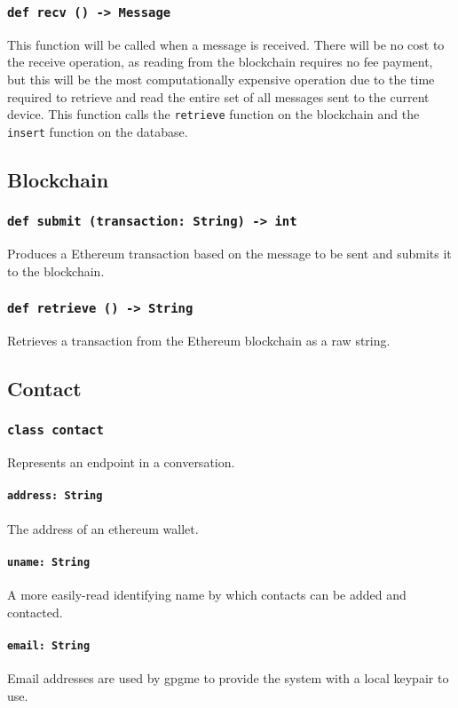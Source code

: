 \documentclass[]{article}
\begin{document}
\subsubsection{\texttt{def recv () -> Message}}
This function will be called when a message is received. There will be no cost to the receive operation, as reading from the blockchain requires no fee payment, but this will be the most computationally expensive operation due to the time required to retrieve and read the entire set of all messages sent to the current device. This function calls the \texttt{retrieve} function on the blockchain and the \texttt{insert} function on the database.

\subsection{Blockchain}
\subsubsection{\texttt{def submit (transaction: String) -> int}}
Produces a Ethereum transaction based on the message to be sent and submits it to the blockchain.
\subsubsection{\texttt{def retrieve () -> String}}
Retrieves a transaction from the Ethereum blockchain as a raw string.

\subsection{Contact}
\subsubsection{\texttt{class contact}}
Represents an endpoint in a conversation.
\paragraph{\texttt{address: String}}
The address of an ethereum wallet.
\paragraph{\texttt{uname: String}}
A more easily-read identifying name by which contacts can be added and contacted.
\paragraph{\texttt{email: String}}
Email addresses are used by gpgme to provide the system with a local keypair to use.
\end{document}
